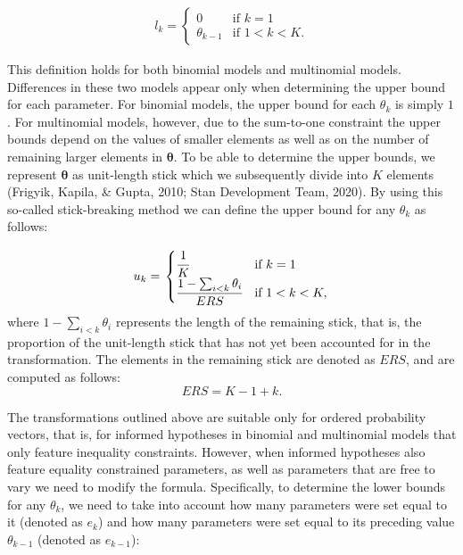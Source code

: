 \begin{appendix}
\begin{align*}
  l_k = \left.
  \begin{cases}
      0 & \text{if } k = 1 \\
      \theta_{k - 1} & \text{if } 1 < k < K.
  \end{cases}
    \right.
\end{align*}

This definition holds for both binomial models and multinomial models.
Differences in these two models appear only when determining the upper
bound for each parameter. For binomial models, the upper bound for each
\(\theta_k\) is simply \(1\). For multinomial models, however, due to
the sum-to-one constraint the upper bounds depend on the values of
smaller elements as well as on the number of remaining larger elements
in \(\boldsymbol{\theta}\). To be able to determine the upper bounds, we
represent \(\boldsymbol{\theta}\) as unit-length stick which we
subsequently divide into \(K\) elements (Frigyik, Kapila, \& Gupta,
2010; Stan Development Team, 2020). By using this so-called
stick-breaking method we can define the upper bound for any \(\theta_k\)
as follows:

\begin{align}
\label{Eq:upperBound}
  u_k = \left.
  \begin{cases}
      \cfrac{1}{K} & \text{if } k = 1 \\
      \cfrac{1 - \sum_{i < k} \theta_i}{ERS} & \text{if } 1 < k < K,
  \end{cases}
    \right.
\end{align} where \(1 - \sum_{i < k} \theta_i\) represents the length of
the remaining stick, that is, the proportion of the unit-length stick
that has not yet been accounted for in the transformation. The elements
in the remaining stick are denoted as \(ERS\), and are computed as
follows: \[ERS = K - 1 + k.\]

The transformations outlined above are suitable only for ordered
probability vectors, that is, for informed hypotheses in binomial and
multinomial models that only feature inequality constraints. However,
when informed hypotheses also feature equality constrained parameters,
as well as parameters that are free to vary we need to modify the
formula. Specifically, to determine the lower bounds for any
\(\theta_k\), we need to take into account how many parameters were set
equal to it (denoted as \(e_k\)) and how many parameters were set equal
to its preceding value \(\theta_{k-1}\) (denoted as \(e_{k-1}\)):


\end{appendix}
